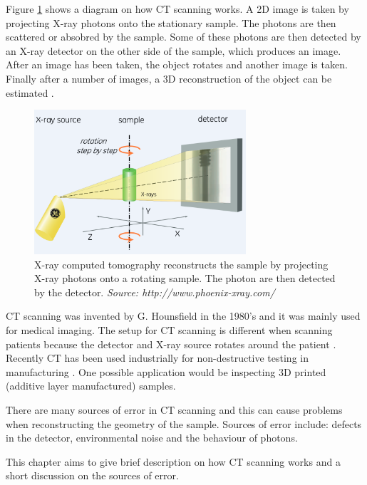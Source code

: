 \documentclass[12pt]{report}
\begin{document}
Figure \ref{fig:x_ray_ct} shows a diagram on how CT scanning works. A 2D image is taken by projecting X-ray photons onto the stationary sample. The photons are then scattered or absobred by the sample.  Some of these photons are then detected by an X-ray detector on the other side of the sample, which produces an image. After an image has been taken, the object rotates and another image is taken. Finally after a number of images, a 3D reconstruction of the object can be estimated \cite{cantatore2011introduction}.

\begin{figure}
\centering
\includegraphics[width=0.7\textwidth]{figures/x_ray_ct.png}
\caption{X-ray computed tomography reconstructs the sample by projecting X-ray photons onto a rotating sample. The photon are then detected by the detector. \emph{Source: http://www.phoenix-xray.com/}}
\label{fig:x_ray_ct}
\end{figure}

CT scanning was invented by G. Hounsfield \cite{hounsfield1980computed} in the 1980's and it was mainly used for medical imaging. The setup for CT scanning is different when scanning patients because the detector and X-ray source rotates around the patient \cite{cantatore2011introduction}. Recently CT has been used industrially for non-destructive testing in manufacturing \cite{cantatore2011introduction}. One possible application would be inspecting 3D printed (additive layer manufactured) samples.

There are many sources of error in CT scanning \cite{cantatore2011introduction} and this can cause problems when reconstructing the geometry of the sample. Sources of error include: defects in the detector, environmental noise and the behaviour of photons.

This chapter aims to give brief description on how CT scanning works and a short discussion on the sources of error.
\end{document}
